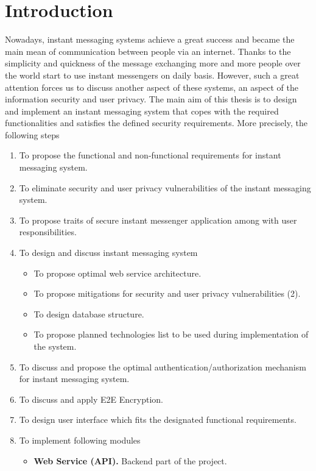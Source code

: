\chapter{Introduction}\label{ch:introduction}
Nowadays, instant messaging systems achieve a great success and became the main mean of communication
between people via an internet.
Thanks to the simplicity and quickness of the message exchanging more and more people over the world start to use
instant messengers on daily basis.
However, such a great attention forces us to discuss another aspect of these systems, an aspect of the
information security and user privacy.
The main aim of this thesis is to design and implement an instant messaging system
that copes with the required functionalities and satisfies the defined security requirements.
More precisely, the following steps
\begin{enumerate}
    \item To propose the functional and non-functional requirements for instant messaging system.
    \item To eliminate security and user privacy vulnerabilities of the instant messaging system.
    \item To propose traits of secure instant messenger application among with user responsibilities.
    \item To design and discuss instant messaging system
    \begin{itemize}
        \item To propose optimal web service architecture.
        \item To propose mitigations for security and user privacy vulnerabilities (2).
        \item To design database structure.
        \item To propose planned technologies list to be used during implementation of the system.
    \end{itemize}
    \item To discuss and propose the optimal authentication/authorization mechanism for instant messaging system.
    \item To discuss and apply E2E Encryption.
    \item To design user interface which fits the designated functional requirements.
    \item To implement following modules
    \begin{itemize}
        \item \textbf{Web Service (API).} Backend part of the project.

\end{itemize}
\end{enumerate}
